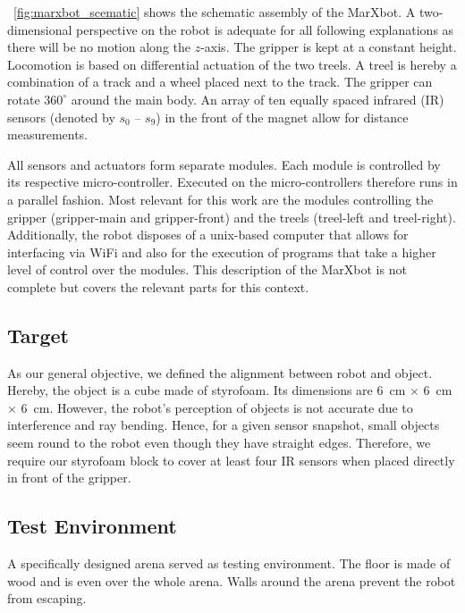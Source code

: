 \figurename~\ref{fig:marxbot_scematic} shows the schematic assembly of the MarXbot. A two-dimensional perspective on the robot is adequate for all following explanations as there will be no motion along the $z$-axis. The gripper is kept at a constant height.
Locomotion is based on differential actuation of the two treels. A treel is hereby a combination of a track and a wheel placed next to the track. The gripper can rotate $360^\circ$ around the main body. An array of ten equally spaced infrared (IR) sensors (denoted by $s_0$ -- $s_9$) in the front of the magnet allow for distance measurements.

All sensors and actuators form separate modules. Each module is controlled by its respective  micro-controller. Executed on the micro-controllers therefore runs in a parallel fashion. Most relevant for this work are the modules controlling the gripper (gripper-main and gripper-front) and the treels (treel-left and treel-right). Additionally, the robot disposes of a unix-based computer that allows for interfacing via WiFi and also for the execution of programs that take a higher level of control over the modules.
This description of the MarXbot is not complete but covers the relevant parts for this context.

\subsection{Target}
As our general objective, we defined the alignment between robot and object. Hereby, the object is a cube made of styrofoam. Its dimensions are 6~cm $\times$ 6~cm $\times$ 6~cm. However, the robot's perception of objects is not accurate due to interference and ray bending. Hence, for a given sensor snapshot, small objects seem round to the robot even though they have straight edges. Therefore, we require our styrofoam block to cover at least four IR sensors when placed directly in front of the gripper.

\subsection{Test Environment}
A specifically designed arena served as testing environment. The floor is made of wood and is even over the whole arena. Walls around the arena prevent the robot from escaping.


